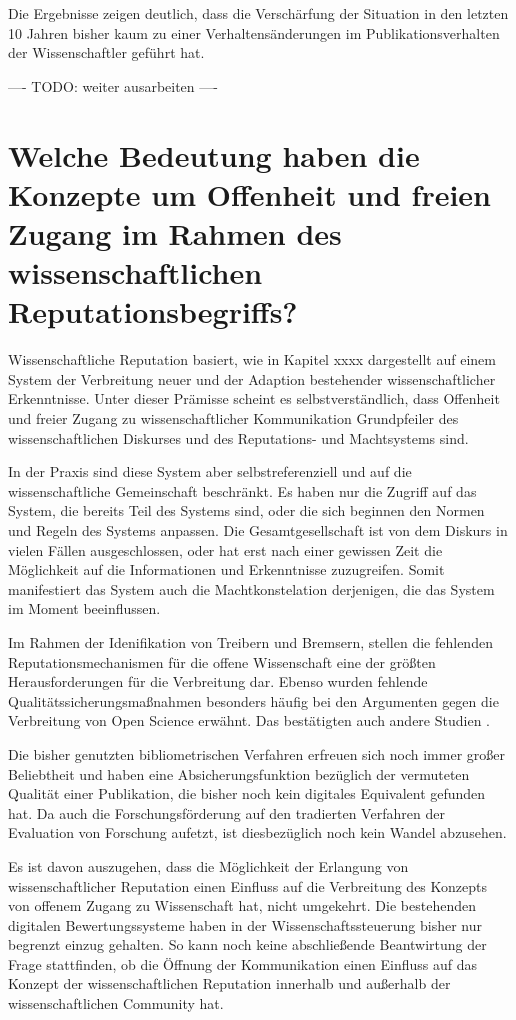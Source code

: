 Die Ergebnisse zeigen deutlich, dass die Verschärfung der Situation in den letzten 10 Jahren bisher kaum zu einer Verhaltensänderungen im Publikationsverhalten der Wissenschaftler geführt hat.

---- TODO: weiter ausarbeiten ----

\section{Welche Bedeutung haben die Konzepte um Offenheit und freien Zugang im Rahmen des wissenschaftlichen Reputationsbegriffs?}

Wissenschaftliche Reputation basiert, wie in Kapitel xxxx dargestellt auf einem System der Verbreitung neuer und der Adaption bestehender wissenschaftlicher Erkenntnisse. Unter dieser Prämisse scheint es selbstverständlich, dass Offenheit und freier Zugang zu wissenschaftlicher Kommunikation Grundpfeiler des wissenschaftlichen Diskurses und des Reputations- und Machtsystems sind.

In der Praxis sind diese System aber selbstreferenziell und auf die wissenschaftliche Gemeinschaft beschränkt. Es haben nur die Zugriff auf das System, die bereits Teil des Systems sind, oder die sich beginnen den Normen und Regeln des Systems anpassen. Die Gesamtgesellschaft ist von dem Diskurs in vielen Fällen ausgeschlossen, oder hat erst nach einer gewissen Zeit die Möglichkeit auf die Informationen und Erkenntnisse zuzugreifen. Somit manifestiert das System auch die Machtkonstelation derjenigen, die das System im Moment beeinflussen.

Im Rahmen der Idenifikation von Treibern und Bremsern, stellen die fehlenden Reputationsmechanismen für die offene Wissenschaft eine der größten Herausforderungen für die Verbreitung dar. Ebenso wurden fehlende Qualitätssicherungsmaßnahmen besonders häufig bei den Argumenten gegen die Verbreitung von Open Science erwähnt. Das bestätigten auch andere Studien \cite{eu_open_science_2015}.

Die bisher genutzten bibliometrischen Verfahren erfreuen sich noch immer großer Beliebtheit und haben eine Absicherungsfunktion bezüglich der vermuteten Qualität einer Publikation, die bisher noch kein digitales Equivalent gefunden hat. Da auch die Forschungsförderung auf den tradierten Verfahren der Evaluation von Forschung aufetzt, ist diesbezüglich noch kein Wandel abzusehen.

Es ist davon auszugehen, dass die Möglichkeit der Erlangung von wissenschaftlicher Reputation einen Einfluss auf die Verbreitung des Konzepts von offenem Zugang zu Wissenschaft hat, nicht umgekehrt. Die bestehenden digitalen Bewertungssysteme haben in der Wissenschaftssteuerung bisher nur begrenzt einzug gehalten. So kann noch keine abschließende Beantwirtung der Frage stattfinden, ob die Öffnung der Kommunikation einen Einfluss auf das Konzept der wissenschaftlichen Reputation innerhalb und außerhalb der wissenschaftlichen Community hat.

